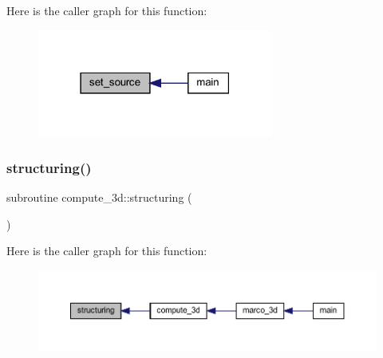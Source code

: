 Here is the caller graph for this function\+:
\nopagebreak
\begin{figure}[H]
\begin{center}
\leavevmode
\includegraphics[width=219pt]{Marco_8f90_a64c5bf1e6006ac36e86c8ff7014ecab7_icgraph}
\end{center}
\end{figure}
\mbox{\label{Marco_8f90_a1f88ff0025ad4aee3032c5278cf5a243}} 
\subsubsection{\texorpdfstring{structuring()}{structuring()}}
{\footnotesize\ttfamily subroutine compute\+\_\+3d\+::structuring (\begin{DoxyParamCaption}{ }\end{DoxyParamCaption})}

Here is the caller graph for this function\+:
\nopagebreak
\begin{figure}[H]
\begin{center}
\leavevmode
\includegraphics[width=350pt]{Marco_8f90_a1f88ff0025ad4aee3032c5278cf5a243_icgraph}
\end{center}
\end{figure}
\mbox{\label{Marco_8f90_afe01227236073e58a677de51fccb36ba}} 
